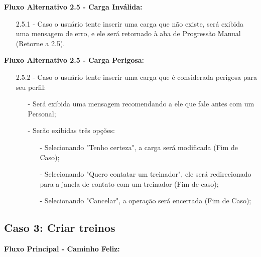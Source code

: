 \documentclass{article}
\begin{document}
    \textbf{Fluxo Alternativo 2.5 - Carga Inválida:}

    \begin{itemize}
        \item[2.5.1 -] Caso o usuário tente inserir uma carga que não existe, será exibida uma mensagem de erro, e ele será retornado à aba de Progressão Manual (Retorne a 2.5).
    \end{itemize}

    \textbf{Fluxo Alternativo 2.5 - Carga Perigosa:}

    \begin{itemize}
        \item[2.5.2 -] Caso o usuário tente inserir uma carga que é considerada perigosa para seu perfil:

        \begin{itemize}
             \item[-] Será exibida uma mensagem recomendando a ele que fale antes com um Personal;
             \item[-] Serão exibidas três opções:
             \begin{itemize}
                 \item[-] Selecionando "Tenho certeza", a carga será modificada (Fim de Caso);
                 \item[-] Selecionando "Quero contatar um treinador", ele será redirecionado para a janela de contato com um treinador (Fim de caso);
                 \item[-] Selecionando "Cancelar", a operação será encerrada (Fim de Caso);
             \end{itemize}
        \end{itemize}
    \end{itemize}

\subsection{Caso 3: Criar treinos}

    \textbf{Fluxo Principal - Caminho Feliz:}
\end{document}
